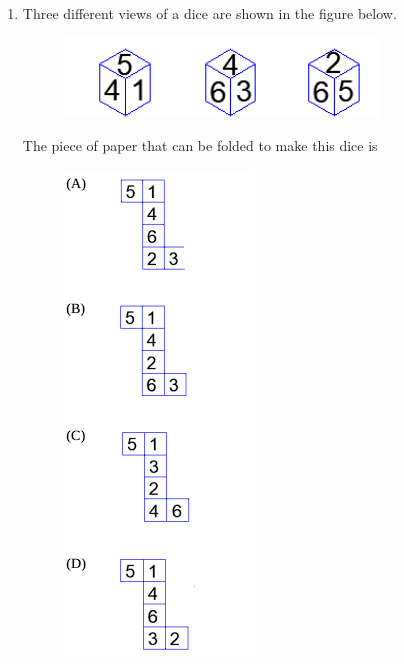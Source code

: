 \documentclass[journal,12pt,onecolumn]{IEEEtran}
\theoremstyle{remark}
\begin{document}
\begin{enumerate}
At the end of one year, the total amount that Person 1 gets is  more than Person 2. The annual rate of return for the mutual funds B and C is 15\% each. What is the annual rate of return for the mutual fund A?

\begin{multicols}{4}
\begin{enumerate}
    \item 7.5\%
    \item 10\%
    \item 15\%
    \item 20\%
\end{enumerate}
\end{multicols}

\hfill (GATE PI 2024)

\item Three different views of a dice are shown in the figure below.

\begin{figure}[H]
\centering
\includegraphics[width=0.5\columnwidth]{fig2.png}
\caption{}
\end{figure}

The piece of paper that can be folded to make this dice is

\begin{figure}[H]
\includegraphics[width=0.3\columnwidth]{fig3.png}
\caption{}
\end{figure}



\end{enumerate}
\end{document}

